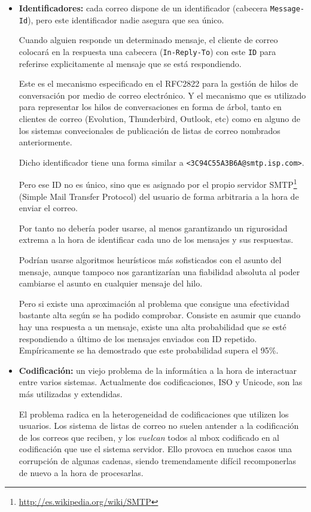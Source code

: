 \begin{itemize}

  \item \textbf{Identificadores:} cada correo dispone de un identificador 
	(cabecera \texttt{Message-Id}), pero este identificador nadie 
	asegura que sea único.

	Cuando alguien responde un determinado mensaje, el cliente de correo 
	colocará en la respuesta una cabecera (\texttt{In-Reply-To}) con este 
	\texttt{ID} para referirse explicitamente al mensaje que se está 
	respondiendo.

	Este es el mecanismo especificado en el RFC2822\cite{Resnick2001} para 
	la gestión de hilos de conversación por medio de correo electrónico. 
	Y el mecanismo que es utilizado para representar los hilos de 
	conversaciones en forma de árbol, tanto en clientes de correo (Evolution, 
	Thunderbird, Outlook, etc) como en alguno de los sistemas convecionales 
	de publicación de listas de correo nombrados anteriormente.

	Dicho identificador tiene una forma similar a 
	\texttt{<3C94C55A3B6A@smtp.isp.com>}.

	Pero ese ID no es único, sino que es asignado por el propio servidor
	SMTP\footnote{\url{http://es.wikipedia.org/wiki/SMTP}} (Simple Mail 
	Transfer Protocol) del usuario de forma arbitraria a la hora de enviar 
	el correo.

	Por tanto no debería poder usarse, al menos garantizando un rigurosidad 
	extrema a la hora de identificar cada uno de los mensajes y sus respuestas.

	Podrían usarse algoritmos heurísticos más sofisticados con el asunto del 
	mensaje, aunque tampoco nos garantizarían una fiabilidad absoluta al 
	poder cambiarse el asunto en cualquier mensaje del hilo.

	Pero si existe una aproximación al problema que consigue una efectividad 
	bastante alta según se ha podido comprobar. Consiste en asumir que cuando 
	hay una respuesta a un mensaje, existe una alta probabilidad que se esté 
	respondiendo a último de los mensajes enviados con ID repetido. Empíricamente 
	se ha demostrado que este probabilidad supera el 95\%.

  \item \textbf{Codificación:} un viejo problema de la informática a la hora de 
	interactuar entre varios sistemas. Actualmente dos codificaciones, ISO 
	y Unicode, son las más utilizadas y extendidas.

	El problema radica en la heterogeneidad de codificaciones que utilizen 
	los usuarios. Los sistema de listas de correo no suelen antender a la 
	codificación de los correos que reciben, y los \emph{vuelcan} todos al 
	mbox codificado en al codificación que use el sistema servidor. Ello 
	provoca en muchos casos una corrupción de algunas cadenas, siendo 
	tremendamente difícil recomponerlas de nuevo a la hora de procesarlas.

\end{itemize}

